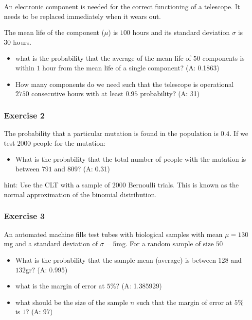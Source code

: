 \documentclass[
]{book}
\providecommand{\tightlist}{%
  \setlength{\itemsep}{0pt}\setlength{\parskip}{0pt}}
\begin{document}
An electronic component is needed for the correct functioning of a telescope. It needs to be replaced immediately when it wears out.

The mean life of the component (\(\mu\)) is \(100\) hours and its standard deviation \(\sigma\) is \(30\) hours.

\begin{itemize}
\item
  what is the probability that the average of the mean life of \(50\) components is within \(1\) hour from the mean life of a single component? (A: 0.1863)
\item
  How many components do we need such that the telescope is operational \(2750\) consecutive hours with at least \(0.95\) probability? (A: 31)
\end{itemize}

\hypertarget{exercise-2-8}{%
\subsubsection{Exercise 2}\label{exercise-2-8}}

The probability that a particular mutation is found in the population is \(0.4\). If we test \(2000\) people for the mutation:

\begin{itemize}
\tightlist
\item
  What is the probability that the total number of people with the mutation is between \(791\) and \(809\)? (A: 0.31)
\end{itemize}

hint: Use the CLT with a sample of \(2000\) Bernoulli trials. This is known as the normal approximation of the binomial distribution.

\hypertarget{exercise-3-5}{%
\subsubsection{Exercise 3}\label{exercise-3-5}}

An automated machine fills test tubes with biological samples with mean \(\mu=130\)mg and a standard deviation of \(\sigma=5\)mg. For a random sample of size \(50\)

\begin{itemize}
\item
  What is the probability that
  the sample mean (average) is between \(128\) and \(132\)gr? (A: 0.995)
\item
  what is the margin of error at \(5\%\)? (A: 1.385929)
\item
  what should be the size of the sample \(n\) such that the margin of error at \(5\%\) is \(1\)?
  (A: 97)
\end{itemize}
\end{document}
